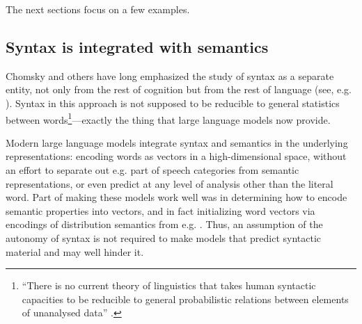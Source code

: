 \documentclass[output=paper,colorlinks,citecolor=brown
]{langscibook}
\begin{document}
The next sections focus on a few examples. 

\subsection{Syntax is integrated with semantics}
Chomsky and others have long emphasized the study of syntax as a separate entity, not only from the rest of cognition but from the rest of language (see, e.g. \cite{chomsky1957syntactic,croft1995autonomy,newmeyer1991functional,adger2018autonomy}). Syntax in this approach is not supposed to be reducible to general statistics between words\footnote{``There is no current theory of linguistics
that takes human syntactic capacities to be reducible to general probabilistic relations between elements of unanalysed data'' \citep{adger2018autonomy}.}---exactly the thing that large language models now provide. 

Modern large language models integrate syntax and semantics in the underlying representations: encoding words as vectors in a high-dimensional space, without an effort to separate out e.g. part of speech categories from semantic representations, or even predict at any level of analysis other than the literal word. Part of making these models work well was in determining how to encode semantic properties into vectors, and in fact initializing word vectors via encodings of distribution semantics from e.g. \cite{mikolov2013distributed} \citep{radford2019language}. Thus, an assumption of the autonomy of syntax is not required to make models that predict syntactic material and may well hinder it. 
\end{document}
